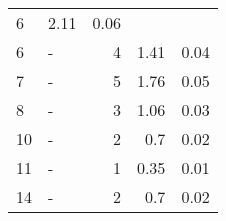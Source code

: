 \begin{longtable}{lXrrr}
       \num{6} &
       \num[round-mode=places,round-precision=2]{2.11} &
         \num[round-mode=places,round-precision=2]{0.06} \\

     6 &
     \multicolumn{1}{X}{ -  } &


       \num{4} &
       \num[round-mode=places,round-precision=2]{1.41} &
         \num[round-mode=places,round-precision=2]{0.04} \\

     7 &
     \multicolumn{1}{X}{ -  } &


       \num{5} &
       \num[round-mode=places,round-precision=2]{1.76} &
         \num[round-mode=places,round-precision=2]{0.05} \\

     8 &
     \multicolumn{1}{X}{ -  } &


       \num{3} &
       \num[round-mode=places,round-precision=2]{1.06} &
         \num[round-mode=places,round-precision=2]{0.03} \\

     10 &
     \multicolumn{1}{X}{ -  } &


       \num{2} &
       \num[round-mode=places,round-precision=2]{0.7} &
         \num[round-mode=places,round-precision=2]{0.02} \\

     11 &
     \multicolumn{1}{X}{ -  } &


       \num{1} &
       \num[round-mode=places,round-precision=2]{0.35} &
         \num[round-mode=places,round-precision=2]{0.01} \\

     14 &
     \multicolumn{1}{X}{ -  } &


       \num{2} &
       \num[round-mode=places,round-precision=2]{0.7} &
         \num[round-mode=places,round-precision=2]{0.02} \\


\end{longtable}

